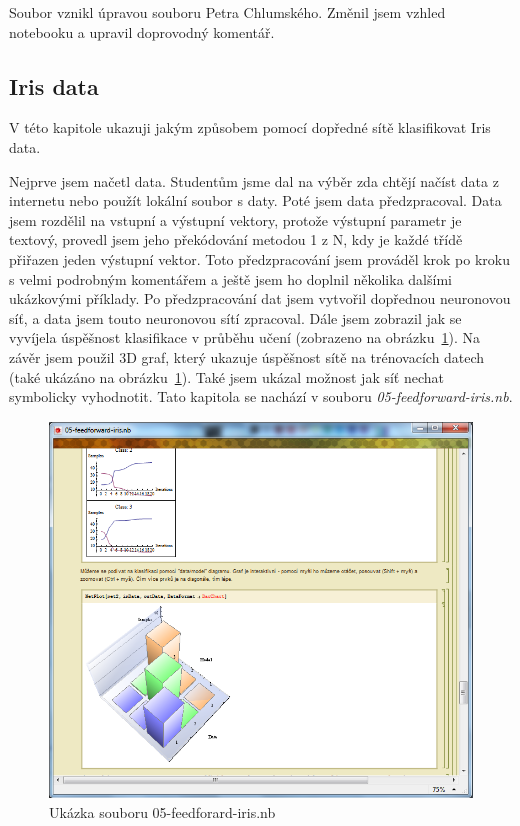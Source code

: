 \documentclass[11pt,twoside,a4paper]{book}
\begin{document}
Soubor vznikl úpravou souboru Petra Chlumského. Změnil jsem vzhled notebooku a upravil doprovodný komentář.

\subsection{Iris data}
V této kapitole ukazuji jakým způsobem pomocí dopředné sítě klasifikovat Iris data.

Nejprve jsem načetl data. Studentům jsme dal na výběr zda chtějí načíst data z internetu nebo použít lokální soubor s daty. Poté jsem data předzpracoval. Data jsem rozdělil na vstupní a výstupní vektory, protože výstupní parametr je textový, provedl jsem jeho překódování metodou 1 z N, kdy je každé třídě přiřazen jeden výstupní vektor. Toto předzpracování jsem prováděl krok po kroku s velmi podrobným komentářem a ještě jsem ho doplnil několika dalšími ukázkovými příklady. Po předzpracování dat jsem vytvořil dopřednou neuronovou síť, a data jsem touto neuronovou sítí zpracoval. Dále jsem zobrazil jak se vyvíjela úspěšnost klasifikace v průběhu učení (zobrazeno na obrázku~\ref{fig:feedforward-iris}). Na závěr jsem použil 3D graf, který ukazuje úspěšnost sítě na trénovacích datech (také ukázáno na obrázku~\ref{fig:feedforward-iris}). Také jsem ukázal možnost jak síť nechat symbolicky vyhodnotit. Tato kapitola se nachází v souboru \textit{05-feedforward-iris.nb}.

\begin{figure}[h!]
\begin{center}
\includegraphics[height=10cm]{figures/ukazka05.png}
\caption{Ukázka souboru 05-feedforard-iris.nb}
\label{fig:feedforward-iris}
\end{center}
\end{figure}
\end{document}
